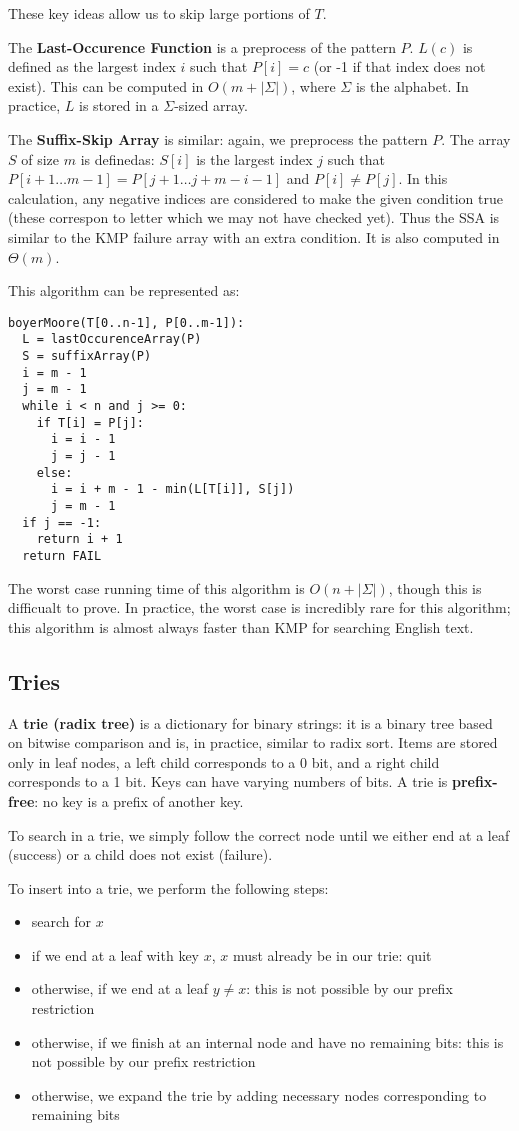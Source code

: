 \documentclass[12pt]{article}
\begin{document}
These key ideas allow us to skip large portions of $T$.

The {\bf Last-Occurence Function} is a preprocess of the pattern $P$. $L(c)$ is defined as the largest index $i$ such that $P[i] = c$ (or -1 if that index does not exist). This can be computed in $O(m + |\Sigma|)$, where $\Sigma$ is the alphabet. In practice, $L$ is stored in a $\Sigma$-sized array.

The {\bf Suffix-Skip Array} is similar: again, we preprocess the pattern $P$. The array $S$ of size $m$ is definedas: $S[i]$ is the largest index $j$ such that$P[i+1\dots m-1] = P[j+1\dots j+m-i-1]$ and $P[i] \neq P[j]$. In this calculation, any negative indices are considered to make the given condition true (these correspon to letter which we may not have checked yet). Thus the SSA is similar to the KMP failure array with an extra condition. It is also computed in $\Theta(m)$.

This algorithm can be represented as:
\begin{verbatim}
boyerMoore(T[0..n-1], P[0..m-1]):
  L = lastOccurenceArray(P)
  S = suffixArray(P)
  i = m - 1
  j = m - 1
  while i < n and j >= 0:
    if T[i] = P[j]:
      i = i - 1
      j = j - 1
    else:
      i = i + m - 1 - min(L[T[i]], S[j])
      j = m - 1
  if j == -1:
    return i + 1
  return FAIL
\end{verbatim}

The worst case running time of this algorithm is $O(n + |\Sigma|)$, though this is difficualt to prove. In practice, the worst case is incredibly rare for this algorithm; this algorithm is almost always faster than KMP for searching English text.

\subsection{Tries}
A {\bf trie (radix tree)} is a dictionary for binary strings: it is a binary tree based on bitwise comparison and is, in practice, similar to radix sort. Items are stored only in leaf nodes, a left child corresponds to a 0 bit, and a right child corresponds to a 1 bit. Keys can have varying numbers of bits. A trie is {\bf prefix-free}: no key is a prefix of another key.

To search in a trie, we simply follow the correct node until we either end at a leaf (success) or a child does not exist (failure).

To insert into a trie, we perform the following steps:
\begin{itemize}
\item search for $x$
\item if we end at a leaf with key $x$, $x$ must already be in our trie: quit
\item otherwise, if we end at a leaf $y \neq x$: this is not possible by our prefix restriction
\item otherwise, if we finish at an internal node and have no remaining bits: this is not possible by our prefix restriction
\item otherwise, we expand the trie by adding necessary nodes corresponding to remaining bits
\end{itemize}
\end{document}
